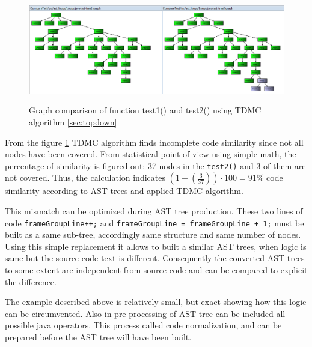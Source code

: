 \documentclass{report}
\begin{document}
\begin{figure}[h]
  \centering
  \includegraphics[width=1.00\textwidth]{Figures/AST-optimization/tree-compared1}\\[0.1cm]
  \caption[Graph comparison on similar AST trees]{Graph comparison of function test1() and test2() using TDMC algorithm \ref{sec:topdown}}
  \label{fig:ast-graph-compare-similar-tdmc}
\end{figure}

From the figure \ref{fig:ast-graph-compare-similar-tdmc} TDMC algorithm finds incomplete code similarity since not all nodes have been covered. From statistical point of view using simple math, the percentage of similarity is figured out: 37 nodes in the \texttt{test2()} and 3 of them are not covered. Thus, the calculation indicates  $\left ( 1 - \left (\frac{3}{37} \right ) \right )\cdot 100 = 91\%$ code similarity according to AST trees and applied TDMC algorithm.

This mismatch can be optimized during AST tree production. These two lines of code \texttt{frameGroupLine++;} and \texttt{frameGroupLine = frameGroupLine + 1;}
must be built as a same sub-tree, accordingly same structure and same number of nodes. Using this simple replacement it allows to built a similar AST trees, when logic is same but the source code text is different. Consequently the converted AST trees to some extent are independent from source code and can be compared to explicit the difference.

The example described above is relatively small, but exact showing how this logic can be circumvented. Also in pre-processing of AST tree can be included all possible java operators. This process called code normalization, and can be prepared before the AST tree will have been built. \\
\end{document}
